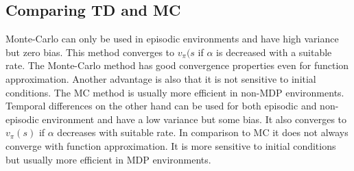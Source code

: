 \subsection{Comparing TD and MC}
Monte-Carlo can only be used in episodic environments and have high variance but zero bias. This method converges to $v_\pi(s$ if $\alpha$ is decreased with a suitable rate. The Monte-Carlo method has good convergence properties even for function approximation. Another advantage is also that it is not sensitive to initial conditions. The MC method is usually more efficient in non-MDP environments. Temporal differences on the other hand can be used for both episodic and non-episodic environment and have a low variance but some bias. It also converges to $v_\pi(s)$ if $\alpha$ decreases with suitable rate. In comparison to MC it does not always converge with function approximation. It is more sensitive to initial conditions but usually more efficient in MDP environments.






